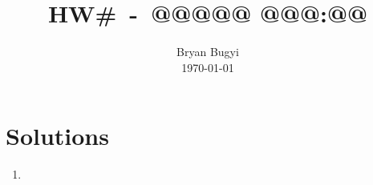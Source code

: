 \documentclass[12pt]{article}
\title{HW#~-~@@@@@ @@@:@@\vspace{-0.5cm}}
\author{Bryan Bugyi\\\today}
\date{}
\begin{document}
\maketitle
\section*{Solutions}
\begin{enumerate}
   \item
\end{enumerate}
\end{document}

